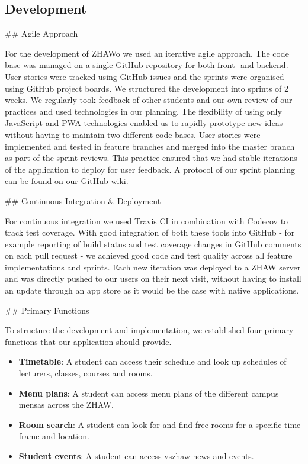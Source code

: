\begin{markdown}
\section{Development} \label{development}

## Agile Approach

For the development of ZHAWo we used an iterative agile approach. The code base was managed on a single GitHub repository \cite{OurGithub} for both front- and backend. User stories were tracked using GitHub issues and the sprints were organised using GitHub project boards. We structured the development into sprints of 2 weeks. We regularly took feedback of other students and our own review of our practices and used technologies in our planning. The flexibility of using only JavaScript and PWA technologies enabled us to rapidly prototype new ideas without having to maintain two different code bases.
User stories were implemented and tested in feature branches and merged into the master branch as part of the sprint reviews. This practice ensured that we had stable iterations of the application to deploy for user feedback. A protocol of our sprint planning can be found on our GitHub wiki.

## Continuous Integration \& Deployment

For continuous integration we used Travis CI \cite{Travis} in combination with Codecov \cite{Codecov} to track test coverage. With good integration of both these tools into GitHub - for example reporting of build status and test coverage changes in GitHub comments on each pull request - we achieved good code and test quality across all feature implementations and sprints.
Each new iteration was deployed to a ZHAW server \cite{OurHost} and was directly pushed to our users on their next visit, without having to install an update through an app store as it would be the case with native applications.

## Primary Functions

To structure the development and implementation, we established four primary functions that our application should provide.

\begin{itemize}
  \item \textbf{Timetable}: A student can access their schedule and look up schedules of lecturers, classes, courses and rooms.
  \item \textbf{Menu plans}: A student can access menu plans of the different campus mensas across the ZHAW.
  \item \textbf{Room search}: A student can look for and find free rooms for a specific time-frame and location.
  \item \textbf{Student events}: A student can access vszhaw news and events.
\end{itemize}


\end{markdown}
